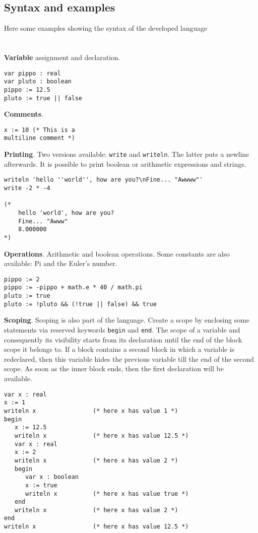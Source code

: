 \documentclass[12pt]{article}
\begin{document}
\subsection{Syntax and examples}
Here some examples showing the syntax of the developed language\\\\\\
\textbf{Variable} assignment and declaration.
\begin{lstlisting}[frame=single]
var pippo : real
var pluto : boolean
pippo := 12.5
pluto := true || false
\end{lstlisting}
\vspace{2cm}
\textbf{Comments}.
\begin{lstlisting}[frame=single]
x := 10 (* This is a
multiline comment *)
\end{lstlisting}
\pagebreak
\textbf{Printing}. Two versions available: \texttt{write} and \texttt{writeln}. The latter puts a newline afterwards. It is possible to print boolean or arithmetic expressions and strings.
\vspace{0.1cm}
\begin{lstlisting}[frame=single]
writeln	'hello ''world'', how are you?\nFine... "Awwww"'
write -2 * -4

(*
	hello 'world', how are you?
	Fine... "Awww"
	8.000000
*)
\end{lstlisting}
\vspace{2cm}
\textbf{Operations}. Arithmetic and boolean operations. Some constants are also available: Pi and the Euler's number.
\begin{lstlisting}[frame=single]
pippo := 2
pippo := -pippo + math.e * 40 / math.pi
pluto := true
pluto := !pluto && (!true || false) && true
\end{lstlisting}
\vspace{2cm}
\textbf{Scoping}. Scoping is also part of the language. Create a scope by enclosing some statements via reserved keywords \texttt{begin} and \texttt{end}. The scope of a variable and consequently its visibility starts from its declaration until the end of the block scope it belongs to. If a block contains a second block in which a variable is redeclared, then this variable hides the previous variable till the end of the second scope. As soon as the inner block ends, then the first declaration will be available.
\pagebreak
\begin{lstlisting}[frame=single]
var x : real
x := 1
writeln x                (* here x has value 1 *)
begin
   x := 12.5
   writeln x             (* here x has value 12.5 *)
   var x : real
   x := 2
   writeln x             (* here x has value 2 *)
   begin
      var x : boolean
      x := true
      writeln x          (* here x has value true *)
   end
   writeln x             (* here x has value 2 *)
end
writeln x                (* here x has value 12.5 *)
\end{lstlisting}
\vspace{1.5cm}
\end{document}
